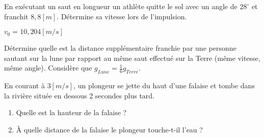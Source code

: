 \begin{exercise}
    En exécutant un saut en longueur un athlète quitte le sol avec un angle de \(28^{\circ}\) et franchit \(8,8[m]\). Détermine sa vitesse lors de l'impulsion.
\end{exercise}
\begin{solution}
    \(v_0=10,204\unit{[m/s]} \)
\end{solution}


\begin{exercise}
    Détermine quelle est la distance supplémentaire franchie par une personne sautant sur la lune par rapport au même saut effectué sur la Terre (même vitesse, même angle). Considère que \(g_{Lune}=\frac{1}{6} g_{Terre}\).
\end{exercise}


\begin{exercise}
    En courant à \(3\unit{[m/s]}\), un plongeur se jette du haut d'une falaise et tombe dans la rivière située en dessous 2 secondes plus tard.
    \begin{enumerate}[label=\alph*)]
        \item Quelle est la hauteur de la falaise ?
        \item À quelle distance de la falaise le plongeur touche-t-il l'eau ?
    \end{enumerate}
\end{exercise}

\begin{exercise}
\end{exercise}

